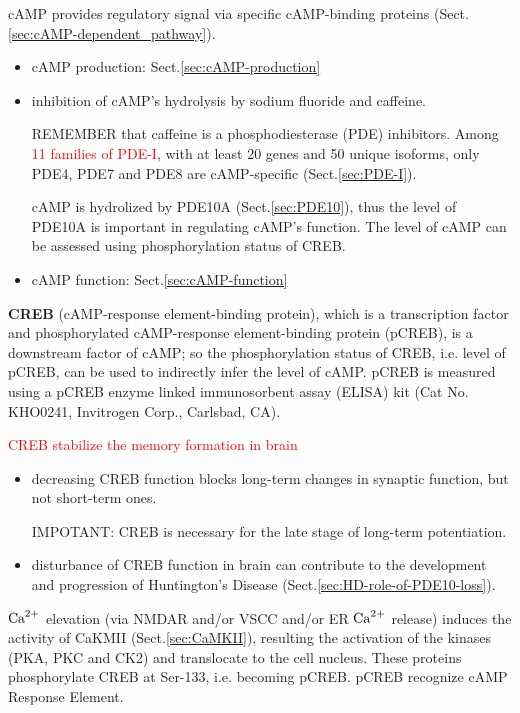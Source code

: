 cAMP provides regulatory signal via specific cAMP-binding proteins
(Sect.\ref{sec:cAMP-dependent_pathway}).  
\begin{itemize}

  \item cAMP production: Sect.\ref{sec:cAMP-production}
  
  \item inhibition of cAMP's hydrolysis  by sodium fluoride and caffeine. 

REMEMBER that caffeine is a phosphodiesterase (PDE) inhibitors. 
Among \textcolor{red}{11 families of PDE-I}, with at least 20 genes and 50
unique isoforms, only PDE4, PDE7 and PDE8 are cAMP-specific \citep{Conti2003}
(Sect.\ref{sec:PDE-I}).
  
cAMP is hydrolized by PDE10A (Sect.\ref{sec:PDE10}), thus the level of PDE10A is
important in regulating cAMP's function. The level of cAMP can be assessed using
phosphorylation status of CREB.

   \item cAMP function: Sect.\ref{sec:cAMP-function}
\end{itemize}


{\bf CREB} (cAMP-response element-binding protein), which is a transcription
factor and phosphorylated cAMP-response element-binding protein (pCREB), is a
downstream factor of cAMP; so the phosphorylation status of CREB, i.e.
level of pCREB, can be used to indirectly infer the level of cAMP.
pCREB is measured using a pCREB enzyme linked immunosorbent assay
(ELISA) kit (Cat No. KHO0241, Invitrogen Corp., Carlsbad, CA).

\textcolor{red}{CREB stabilize the memory formation in brain}
\begin{itemize}
  \item  decreasing CREB function blocks long-term changes in synaptic function,
  but not short-term ones.
  
IMPOTANT: CREB is necessary for the late stage of long-term potentiation. 

  \item disturbance of CREB function in brain can contribute to the development
  and progression of Huntington's Disease  (Sect.\ref{sec:HD-role-of-PDE10-loss}). 

\end{itemize}

${\text{Ca}^{2+}}$ elevation (via NMDAR and/or VSCC and/or ER ${\text{Ca}^{2+}}$ release) induces the
activity of CaKMII (Sect.\ref{sec:CaMKII}), resulting the activation of the
kinases (PKA, PKC and CK2) and translocate to the cell nucleus. These proteins
phosphorylate CREB at Ser-133, i.e. becoming pCREB.
pCREB recognize cAMP Response Element.

